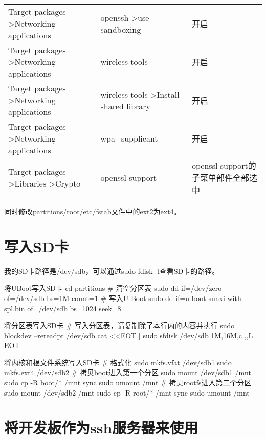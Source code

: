 \documentclass[lang=cn,newtx,10pt,scheme=chinese]{elegantbook}
\begin{document}
\begin{table}[]
\begin{tabular}{lll}
Target packages \textgreater Networking applications       & openssh \textgreater use sandboxing                & 开启                        \\
Target packages \textgreater Networking applications       & wireless tools                                     & 开启                        \\
Target packages \textgreater Networking applications       & wireless tools \textgreater Install shared library & 开启                        \\
Target packages \textgreater Networking applications       & wpa\_supplicant                                    & 开启                        \\
Target packages \textgreater Libraries \textgreater Crypto & openssl support                                    & openssl support的子菜单部件全部选中
\end{tabular}
\end{table}

同时修改partitions/root/etc/fstab文件中的ext2为ext4。

\section{写入SD卡}

我的SD卡路径是/dev/sdb，可以通过sudo fdisk -l查看SD卡的路径。

\begin{mycode}{将UBoot写入SD卡}
cd partitions
# 清空分区表
sudo dd if=/dev/zero of=/dev/sdb bs=1M count=1
# 写入U-Boot
sudo dd if=u-boot-sunxi-with-spl.bin of=/dev/sdb bs=1024 seek=8
\end{mycode}

\begin{mycode}{将分区表写入SD卡}
# 写入分区表，请复制除了本行内的内容并执行
sudo blockdev --rereadpt /dev/sdb
cat <<EOT | sudo sfdisk /dev/sdb
1M,16M,c
,,L
EOT
\end{mycode}

\begin{mycode}{将内核和根文件系统写入SD卡}
# 格式化
sudo mkfs.vfat /dev/sdb1
sudo mkfs.ext4 /dev/sdb2
# 拷贝boot进入第一个分区
sudo mount /dev/sdb1 /mnt
sudo cp -R boot/* /mnt
sync
sudo umount /mnt
# 拷贝rootfs进入第二个分区
sudo mount /dev/sdb2 /mnt
sudo cp -R root/* /mnt
sync
sudo umount /mnt
\end{mycode}

\section{将开发板作为ssh服务器来使用}
\end{document}
